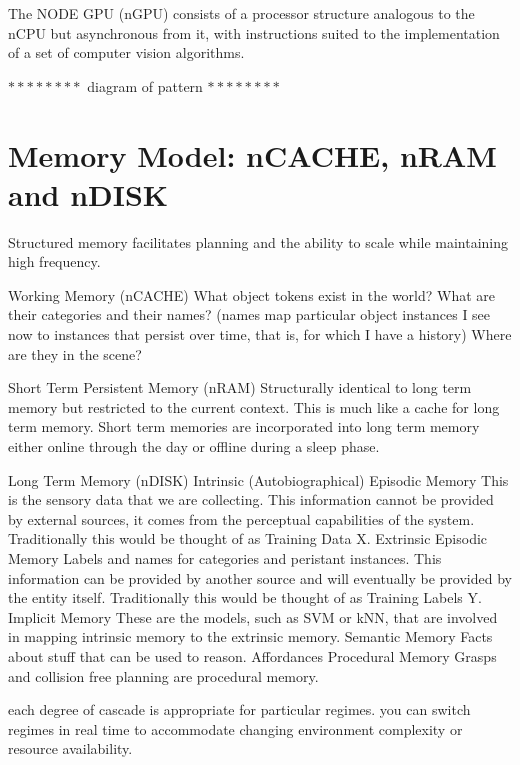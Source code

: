 \documentclass[conference]{IEEEtran}
\begin{document}
The NODE GPU (nGPU) consists of a processor structure analogous to the nCPU but asynchronous from
it, with instructions suited to the implementation of a set of computer vision algorithms.





$********$ diagram of pattern $********$


\section{Memory Model: nCACHE, nRAM and nDISK}
Structured memory facilitates planning and the ability to scale while maintaining
high frequency.

Working Memory (nCACHE)
  What object tokens exist in the world? 
  What are their categories and their names? 
    (names map particular object instances I see now to instances that persist over
     time, that is, for which I have a history)
  Where are they in the scene?

Short Term Persistent Memory (nRAM)
  Structurally identical to long term memory but restricted to the current context.
  This is much like a cache for long term memory. Short term memories are incorporated 
  into long term memory either online through the day or offline during a sleep phase.
  
Long Term Memory (nDISK)
  Intrinsic (Autobiographical) Episodic Memory
    This is the sensory data that we are collecting.
    This information cannot be provided by external
    sources, it comes from the perceptual capabilities of the system.
    Traditionally this would be thought of as Training Data X.
  Extrinsic Episodic Memory
    Labels and names for categories and peristant instances.
    This information can be provided by another source and will
    eventually be provided by the entity itself.
    Traditionally this would be thought of as Training Labels Y.
  Implicit Memory
    These are the models, such as SVM or kNN, that are involved in
    mapping intrinsic memory to the extrinsic memory.
  Semantic Memory
    Facts about stuff that can be used to reason. Affordances
  Procedural Memory
    Grasps and collision free planning are procedural memory.


each degree of cascade is appropriate for particular regimes. you can switch regimes in 
real time to accommodate changing environment complexity or resource availability.
\end{document}
